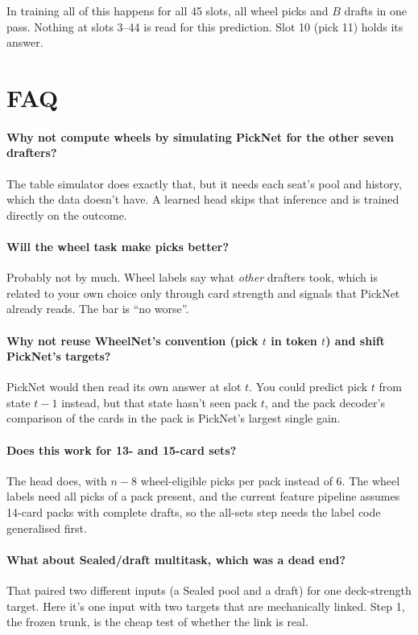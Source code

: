 \documentclass[11pt,letterpaper]{article}
\begin{document}
\noindent In training all of this happens for all 45 slots, all wheel picks and $B$ drafts in one pass.
Nothing at slots 3--44 is read for this prediction. Slot 10 (pick 11) holds its answer.

\section{FAQ}

\paragraph{Why not compute wheels by simulating PickNet for the other seven drafters?} The table simulator
does exactly that, but it needs each seat's pool and history, which the data doesn't have. A learned head
skips that inference and is trained directly on the outcome.

\paragraph{Will the wheel task make picks better?} Probably not by much. Wheel labels say what \emph{other}
drafters took, which is related to your own choice only through card strength and signals that PickNet
already reads. The bar is ``no worse''.

\paragraph{Why not reuse WheelNet's convention (pick $t$ in token $t$) and shift PickNet's targets?} PickNet would
then read its own answer at slot $t$. You could predict pick $t$ from state $t-1$ instead, but that state
hasn't seen pack $t$, and the pack decoder's comparison of the cards in the pack is PickNet's largest single
gain.

\paragraph{Does this work for 13- and 15-card sets?} The head does, with $n-8$ wheel-eligible picks per pack
instead of 6. The wheel labels need all picks of a pack present, and the current feature pipeline assumes
14-card packs with complete drafts, so the all-sets step needs the label code generalised first.

\paragraph{What about Sealed/draft multitask, which was a dead end?} That paired two different inputs (a
Sealed pool and a draft) for one deck-strength target. Here it's one input with two targets that are
mechanically linked. Step 1, the frozen trunk, is the cheap test of whether the link is real.
\end{document}
